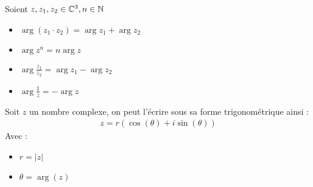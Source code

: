 \begin{graybox}
\begin{proposition}
    Soient $z, z_1, z_2 \in \mathbb{C}^3, n \in \mathbb{N}$
    \begin{itemize}
        \item $\arg{(z_1 \cdot z_2)} = \arg{z_1} + \arg{z_2}$
        \item $\arg{z^n} = n\arg{z}$
        \item $\arg{\frac{z_1}{z_2}} = \arg{z_1} - \arg{z_2}$
        \item $\arg{\frac{1}{z}} = -\arg{z}$
    \end{itemize}
\end{proposition}
\end{graybox}

\begin{graybox}
\begin{definition}
    Soit $z$ un nombre complexe, on peut l'écrire sous sa forme trigonométrique ainsi :
    \begin{align*}
        z = r (\cos{(\theta)} + i \sin{(\theta)}) 
    \end{align*}
    Avec :
    \begin{itemize}
        \item $r = |z|$
        \item $\theta = \arg{(z)}$
    \end{itemize}
\end{definition}
\end{graybox}

